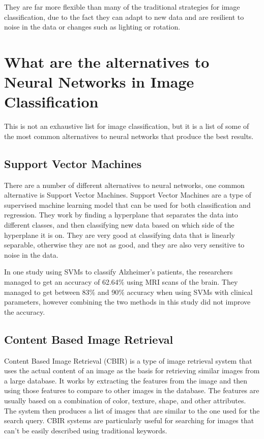 \documentclass[]{final_report}
\begin{document}
They are far more flexible than many of the traditional strategies for image classification, due to the fact they can adapt to new data and are
resilient to noise in the data or changes such as lighting or rotation.

\pagebreak
\section{What are the alternatives to Neural Networks in Image Classification}

This is not an exhaustive list for image classification, but it is a list of some of the most common alternatives to neural networks
that produce the best results.

\subsection{Support Vector Machines}
There are a number of different alternatives to neural networks, one common alternative is Support Vector Machines.
Support Vector Machines are a type of supervised machine learning model that can be used for both classification and regression.
They work by finding a hyperplane that separates the data into different classes, and then classifying new data based on which side of the hyperplane it is on.
They are very good at classifying data that is linearly separable, otherwise they are not as good,
and they are also very sensitive to noise in the data.

In one study using SVMs to classify Alzheimer's patients, the researchers managed to get an accuracy of 62.64\% using MRI scans of the brain.
They managed to get between 83\% and 90\% accuracy when using SVMs with clinical parameters, however combining the two methods in this study did not improve the accuracy. \cite{10.3389/fneur.2021.640696}

\subsection{Content Based Image Retrieval}
Content Based Image Retrieval (CBIR) is a type of image retrieval system that uses the actual content of an image as the basis for retrieving similar
images from a large database. It works by extracting the features from the image and then using those features to compare to other images in the database.
The features are usually based on a combination of color, texture, shape, and other attributes. The system then produces a list of images that are similar
to the one used for the search query. CBIR systems are particularly useful for searching for images that can't be easily described using traditional keywords.
\end{document}
